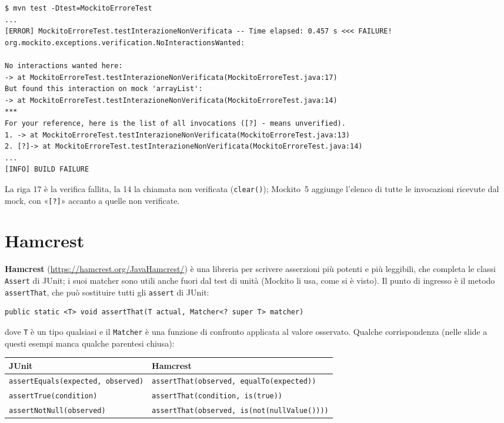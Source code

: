 \begin{lstlisting}[style=shell, name=Terminale, deletestring={[b]'}]
$ mvn test -Dtest=MockitoErroreTest
...
[ERROR] MockitoErroreTest.testInterazioneNonVerificata -- Time elapsed: 0.457 s <<< FAILURE!
org.mockito.exceptions.verification.NoInteractionsWanted:

No interactions wanted here:
-> at MockitoErroreTest.testInterazioneNonVerificata(MockitoErroreTest.java:17)
But found this interaction on mock 'arrayList':
-> at MockitoErroreTest.testInterazioneNonVerificata(MockitoErroreTest.java:14)
***
For your reference, here is the list of all invocations ([?] - means unverified).
1. -> at MockitoErroreTest.testInterazioneNonVerificata(MockitoErroreTest.java:13)
2. [?]-> at MockitoErroreTest.testInterazioneNonVerificata(MockitoErroreTest.java:14)
...
[INFO] BUILD FAILURE
\end{lstlisting}

La riga 17 è la verifica fallita, la 14 la chiamata non verificata (\texttt{clear()}); Mockito~5 aggiunge l'elenco di
tutte le invocazioni ricevute dal mock, con «\texttt{[?]}» accanto a quelle non verificate.

\section{Hamcrest}

\textbf{Hamcrest} (\url{https://hamcrest.org/JavaHamcrest/}) è una libreria per scrivere asserzioni più potenti e più
leggibili, che completa le classi \texttt{Assert} di JUnit; i suoi matcher sono utili anche fuori dal test di unità
(Mockito li usa, come si è visto). Il punto di ingresso è il metodo \texttt{assertThat}, che può sostituire tutti gli
\texttt{assert} di JUnit:

\begin{lstlisting}[style=java]
public static <T> void assertThat(T actual, Matcher<? super T> matcher)
\end{lstlisting}

dove \texttt{T} è un tipo qualsiasi e il \texttt{Matcher} è una funzione di confronto applicata al valore osservato.
Qualche corrispondenza (nelle slide a questi esempi manca qualche parentesi chiusa):

\begin{center}
\small
\begin{tabular}{ll}
  \toprule
  \textbf{JUnit} & \textbf{Hamcrest} \\
  \midrule
  \texttt{assertEquals(expected, observed)} & \texttt{assertThat(observed, equalTo(expected))} \\
  \texttt{assertTrue(condition)}            & \texttt{assertThat(condition, is(true))} \\
  \texttt{assertNotNull(observed)}          & \texttt{assertThat(observed, is(not(nullValue())))} \\
  \bottomrule
\end{tabular}
\end{center}

